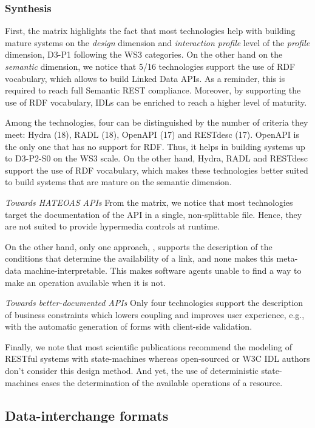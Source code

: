 \subsubsection*{Synthesis}

First, the matrix highlights the fact that most technologies help with building mature systems on the \textit{design} dimension and \textit{interaction profile} level of the \textit{profile} dimension, D3-P1 following the WS3 categories.
On the other hand on the \textit{semantic} dimension, we notice that 5/16 technologies support the use of RDF vocabulary, which allows to build Linked Data APIs. As a reminder, this is required to reach full Semantic REST compliance.
Moreover, by supporting the use of RDF vocabulary, IDLs can be enriched to reach a higher level of maturity.

Among the technologies, four can be distinguished by the number of criteria they meet: Hydra (18), RADL (18), OpenAPI (17) and RESTdesc (17).
OpenAPI is the only one that has no support for RDF. Thus, it helps in building systems up to D3-P2-S0 on the WS3 scale.
On the other hand, Hydra, RADL and RESTdesc support the use of RDF vocabulary, which makes these technologies better suited to build systems that are mature on the semantic dimension.

\textit{Towards HATEOAS APIs}
From the matrix, we notice that most technologies target the documentation of the API in a single, non-splittable file. Hence, they are not suited to provide hypermedia controls at runtime.

On the other hand, only one approach, \cite{Schreier:2011:MRA:1967428.1967434}, supports the description of the conditions that determine the availability of a link, and none makes this meta-data machine-interpretable. This makes software agents unable to find a way to make an operation available when it is not.

\textit{Towards better-documented APIs}
Only four technologies support the description of business constraints which lowers coupling and improves user experience, e.g., with the automatic generation of forms with client-side validation.

Finally, we note that most scientific publications recommend the modeling of RESTful systems with state-machines whereas open-sourced or W3C IDL authors don't consider this design method. And yet, the use of deterministic state-machines eases the determination of the available operations of a resource.

\subsection{Data-interchange formats}

